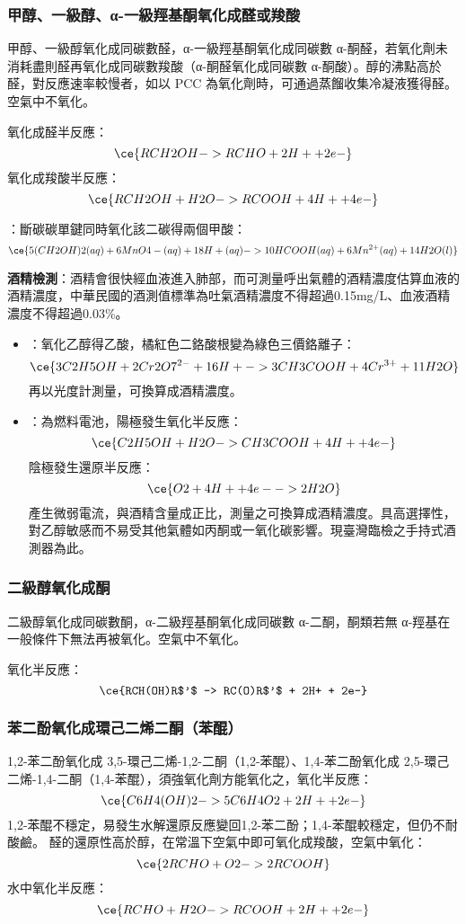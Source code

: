 \documentclass[a4paper,12pt]{report}
\begin{document}
\begin{itemize}
\subsubsection{甲醇、一級醇、α-一級羥基酮氧化成醛或羧酸}
甲醇、一級醇氧化成同碳數醛，α-一級羥基酮氧化成同碳數 α-酮醛，若氧化劑未消耗盡則醛再氧化成同碳數羧酸（α-酮醛氧化成同碳數 α-酮酸）。醇的沸點高於醛，對反應速率較慢者，如以 PCC 為氧化劑時，可通過蒸餾收集冷凝液獲得醛。空氣中不氧化。

氧化成醛半反應：
\[\ce{RCH2OH -> RCHO + 2H+ + 2e-}\]
氧化成羧酸半反應：
\[\ce{RCH2OH + H2O -> RCOOH + 4H+ + 4e-}\]

：斷碳碳單鍵同時氧化該二碳得兩個甲酸：
\[\ce{5(CH2OH)2(aq) + 6MnO4-(aq) + 18H+(aq) -> 10HCOOH(aq) + 6Mn^{2+}(aq) + 14H2O(l)}\]

\textbf{酒精檢測}：酒精會很快經血液進入肺部，而可測量呼出氣體的酒精濃度估算血液的酒精濃度，中華民國的酒測值標準為吐氣酒精濃度不得超過0.15mg/L、血液酒精濃度不得超過0.03\%。
\begin{itemize}
\item {}：氧化乙醇得乙酸，橘紅色二鉻酸根變為綠色三價鉻離子：
\[\ce{3C2H5OH + 2Cr2O7^{2-} + 16H+ -> 3CH3COOH + 4Cr^{3+} + 11 H2O}\]
再以光度計測量，可換算成酒精濃度。
\item{}：為燃料電池，陽極發生氧化半反應：
\[\ce{C2H5OH + H2O -> CH3COOH + 4H+ + 4e-}\]
陰極發生還原半反應：
\[\ce{O2 + 4H+ + 4e- -> 2H2O}\]
產生微弱電流，與酒精含量成正比，測量之可換算成酒精濃度。具高選擇性，對乙醇敏感而不易受其他氣體如丙酮或一氧化碳影響。現臺灣臨檢之手持式酒測器為此。
\end{itemize}
\subsubsection{二級醇氧化成酮}
二級醇氧化成同碳數酮，α-二級羥基酮氧化成同碳數 α-二酮，酮類若無 α-羥基在一般條件下無法再被氧化。空氣中不氧化。

氧化半反應：
\[\ce{RCH(OH)R$'$ -> RC(O)R$'$ + 2H+ + 2e-}\]
\subsubsection{苯二酚氧化成環己二烯二酮（苯醌）}
1,2-苯二酚氧化成 3,5-環己二烯-1,2-二酮（1,2-苯醌）、1,4-苯二酚氧化成 2,5-環己二烯-1,4-二酮（1,4-苯醌），須強氧化劑方能氧化之，氧化半反應：
\[\ce{C6H4(OH)2 -> 5C6H4O2 + 2H+ + 2e-}\]
1,2-苯醌不穩定，易發生水解還原反應變回1,2-苯二酚；1,4-苯醌較穩定，但仍不耐酸鹼。
醛的還原性高於醇，在常溫下空氣中即可氧化成羧酸，空氣中氧化：
\[\ce{2RCHO + O2 -> 2RCOOH}\]
水中氧化半反應：
\[\ce{RCHO + H2O -> RCOOH + 2H+ + 2e-}\]

\end{itemize}
\end{document}
